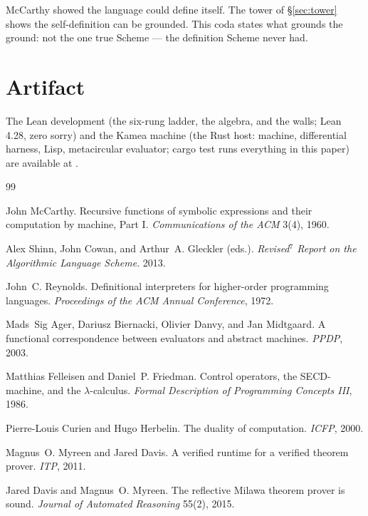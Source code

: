 \documentclass[acmsmall,screen,review]{acmart}
\begin{document}
McCarthy showed the language could define itself. The tower of
\S\ref{sec:tower} shows the self-definition can be grounded. This
coda states what grounds the ground: not the one true Scheme --- the
definition Scheme never had.

\section*{Artifact}

The Lean development (the six-rung ladder, the algebra, and the
walls; Lean 4.28, zero \textsf{sorry}) and the Kamea machine (the
Rust host: machine, differential harness, Lisp, metacircular
evaluator; \textsf{cargo test} runs everything in this paper) are
available at \cite{artifact-lean,artifact-rust}.

\begin{thebibliography}{99}

John McCarthy.
\newblock Recursive functions of symbolic expressions and their
  computation by machine, Part I.
\newblock \emph{Communications of the ACM} 3(4), 1960.

Alex Shinn, John Cowan, and Arthur~A. Gleckler (eds.).
\newblock \emph{Revised$^7$ Report on the Algorithmic Language
  Scheme}. 2013.

John~C. Reynolds.
\newblock Definitional interpreters for higher-order programming
  languages.
\newblock \emph{Proceedings of the ACM Annual Conference}, 1972.

Mads~Sig Ager, Dariusz Biernacki, Olivier Danvy, and Jan Midtgaard.
\newblock A functional correspondence between evaluators and abstract
  machines.
\newblock \emph{PPDP}, 2003.

Matthias Felleisen and Daniel~P. Friedman.
\newblock Control operators, the SECD-machine, and the
  $\lambda$-calculus.
\newblock \emph{Formal Description of Programming Concepts III},
  1986.

Pierre-Louis Curien and Hugo Herbelin.
\newblock The duality of computation.
\newblock \emph{ICFP}, 2000.

Magnus~O. Myreen and Jared Davis.
\newblock A verified runtime for a verified theorem prover.
\newblock \emph{ITP}, 2011.

Jared Davis and Magnus~O. Myreen.
\newblock The reflective Milawa theorem prover is sound.
\newblock \emph{Journal of Automated Reasoning} 55(2), 2015.


\end{thebibliography}
\end{document}
